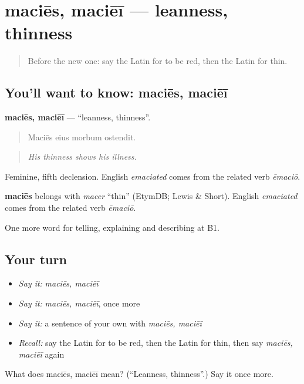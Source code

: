 \section[maciēs, maciēī]{maciēs, maciēī — leanness, thinness}

\label{lesson:LA-C522-macies}



\begin{quote}
Before the new one: say the Latin for to be red, then the Latin for thin.
\end{quote}

\subsection*{You'll want to know: maciēs, maciēī}
\textbf{maciēs, maciēī} — \textquotedblleft{}leanness, thinness\textquotedblright{}.

\begin{quote}
Maciēs eius morbum ostendit.
\end{quote}

\begin{quote}
\emph{His thinness shows his illness.}
\end{quote}

Feminine, fifth declension. English \emph{emaciated} comes from the related verb \emph{ēmaciō}.

\begin{cousinweb}
\textbf{maciēs} belongs with \emph{macer} \textquotedblleft{}thin\textquotedblright{} (EtymDB; Lewis \& Short). English \emph{emaciated} comes from the related verb \emph{ēmaciō}.
\end{cousinweb}

\begin{grammarlens}[title={What you've built}]
One more word for telling, explaining and describing at B1.
\end{grammarlens}

\subsection*{Your turn}
\begin{itemize}
\raggedright
  \item \emph{Say it:} \emph{maciēs, maciēī}
  \item \emph{Say it:} \emph{maciēs, maciēī}, once more
  \item \emph{Say it:} a sentence of your own with \emph{maciēs, maciēī}
  \item \emph{Recall:} say the Latin for to be red, then the Latin for thin, then say \emph{maciēs, maciēī} again
\end{itemize}

\begin{tcolorbox}[breakable,colback=teal!4,colframe=teal!35!black,title={Before you move on}]
What does maciēs, maciēī mean? (\textquotedblleft{}Leanness, thinness\textquotedblright{}.) Say it once more.
\end{tcolorbox}

